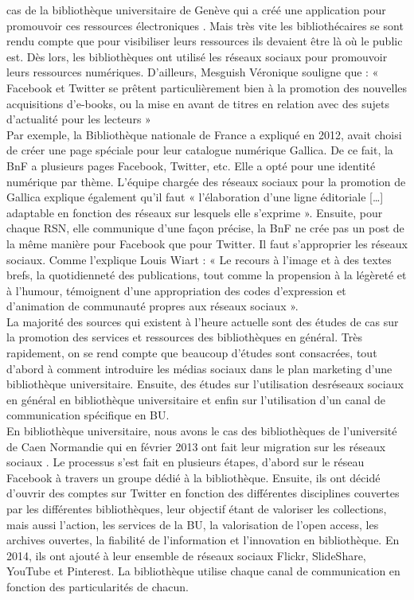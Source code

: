 \documentclass[a4paper,11pt]{article} %
\begin{document}
cas de la bibliothèque universitaire de Genève qui a créé une application pour promouvoir ces ressources électroniques \citep{iriarte2018ebooks,}. Mais très vite les bibliothécaires se sont rendu compte que pour visibiliser leurs ressources ils devaient être là où le public est. Dès lors, les bibliothèques ont utilisé les réseaux sociaux pour promouvoir leurs ressources numériques. D’ailleurs, Mesguish Véronique souligne que : « Facebook et Twitter se prêtent particulièrement bien à la promotion des nouvelles acquisitions d’e-books, ou la mise en avant de titres en relation avec des sujets 
d’actualité pour les lecteurs »\citep{mesguich2017bibliothèques,}
\\Par exemple, la Bibliothèque nationale de France a expliqué en 2012, avait choisi de créer une page spéciale pour leur catalogue numérique Gallica. De ce fait, la BnF a plusieurs pages Facebook, Twitter, etc.\citep{leroy2012bibliotheque,} Elle a opté pour une identité numérique par thème. L’équipe chargée des réseaux sociaux pour la promotion de Gallica explique également qu’il faut « l’élaboration d’une ligne éditoriale […] adaptable en fonction des réseaux sur lesquels elle s’exprime »\citep{leroy2012bibliotheque,}. Ensuite, pour chaque RSN, elle communique d’une façon précise, la BnF ne crée pas un post de la même manière pour Facebook que pour Twitter. Il faut s’approprier les réseaux sociaux. Comme l’explique Louis Wiart : « Le recours à l’image et à des textes brefs, la quotidienneté des publications, tout comme la propension à la légèreté et à l’humour, témoignent d’une appropriation des codes d’expression et d’animation de communauté propres aux réseaux sociaux »\citep{leroy2012bibliotheque,}.
\\La majorité des sources qui existent à l’heure actuelle sont des études de cas sur la promotion des services et ressources des bibliothèques en général. Très rapidement, on se rend compte que beaucoup d’études sont consacrées, tout d’abord à comment introduire les médias sociaux dans le plan marketing d’une bibliothèque universitaire. Ensuite, des études sur
l’utilisation desréseaux sociaux en général en bibliothèque universitaire et enfin sur l’utilisation d’un canal de communication spécifique en BU.
\\En bibliothèque universitaire, nous avons le cas des bibliothèques de l’université de 
Caen Normandie qui en février 2013 ont fait leur migration sur les réseaux sociaux \citep{chuiton2018construire,}. Le processus s’est fait en plusieurs étapes, d’abord sur le réseau Facebook à travers un groupe dédié à la bibliothèque. Ensuite, ils ont décidé d’ouvrir des comptes sur Twitter en fonction des différentes disciplines couvertes par les différentes bibliothèques, leur objectif étant de valoriser les collections, mais aussi l’action, les services de la BU, la valorisation de l’open access, les archives ouvertes, la fiabilité de l’information et l’innovation en bibliothèque. En 2014, ils ont ajouté à leur ensemble de réseaux sociaux Flickr, SlideShare, YouTube et Pinterest. La bibliothèque utilise chaque canal de communication en fonction des particularités de chacun.
\end{document}
